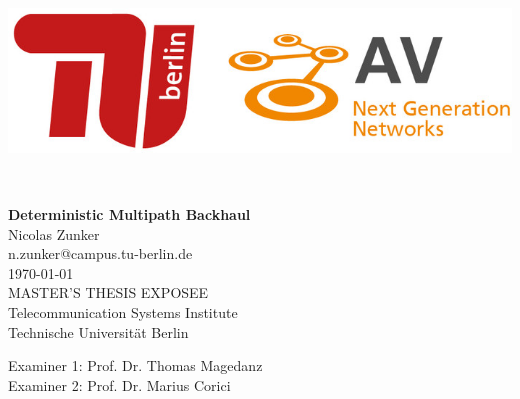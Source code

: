 
\thispagestyle{empty}

\begin{center}
\includegraphics[width=.67\linewidth, height=.2\linewidth]{fig/Logo_Header}
\end{center}
\mbox{}\\[1pc]
\begin{center}
    \huge{ \bfseries Deterministic Multipath Backhaul}\\[2pc]

    \Large{Nicolas Zunker}\\
    \large{n.zunker@campus.tu-berlin.de}\\[1pc]
    \large{\today}\\[2pc]

    MASTER'S THESIS EXPOSEE\\
    Telecommunication Systems Institute\\
    Technische Universität Berlin
\end{center}
\vfill

Examiner 1: Prof. Dr. Thomas Magedanz
\hfill{}\\
Examiner 2: Prof. Dr. Marius Corici

\afterpage{\null\thispagestyle{empty}\newpage}
